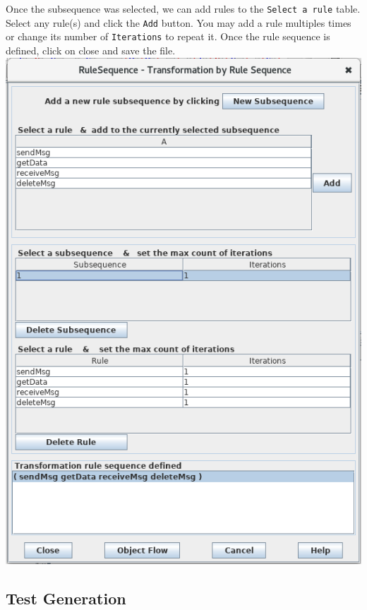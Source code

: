\documentclass[12pt]{article}
\newenvironment{tutorialstep}
	{\hspace{-\parindent}\begin{minipage}{\textwidth}}
    {\vspace{.3cm}\end{minipage}}
\begin{document}
\begin{tutorialstep}

  Once the subsequence was selected, we can add rules to the \texttt{Select a rule} table. Select any rule(s) and click the \texttt{Add} button. You may add a rule multiples times or change its number of \texttt{Iterations} to repeat it. Once the rule sequence is defined, click on close and save the file.\\

  \noindent
  \centering
  \includegraphics[scale = 0.6]{img/concurrent-rules/rule-sequence_03.png}\\
\end{tutorialstep}

\subsection{Test Generation}
\end{document}
